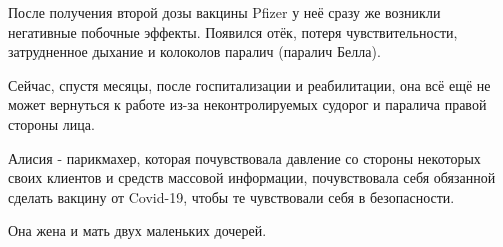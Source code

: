 После получения второй дозы вакцины Pfizer у неё сразу же возникли негативные
побочные эффекты. Появился отёк, потеря чувствительности, затрудненное дыхание и
колоколов паралич (паралич Белла).

Сейчас, спустя месяцы, после госпитализации и реабилитации, она всё ещё не может
вернуться к работе из-за неконтролируемых судорог и паралича правой стороны
лица.

Алисия - парикмахер, которая почувствовала давление со стороны некоторых своих
клиентов и средств массовой информации, почувствовала себя обязанной сделать
вакцину от Covid-19, чтобы те чувствовали себя в безопасности.

Она жена и мать двух маленьких дочерей.
